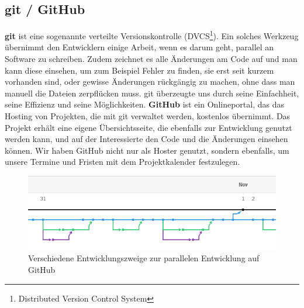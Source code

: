\documentclass[12pt,a4paper]{scrartcl}
\begin{document}
\subsection{git / GitHub}
\textbf{git} ist eine sogenannte verteilte Versionskontrolle (DVCS\footnote{Distributed Version Control System}). Ein solches Werkzeug übernimmt
den Entwicklern einige Arbeit, wenn es darum geht, parallel an Software zu schreiben. Zudem zeichnet es alle Änderungen am Code auf und man kann diese
einsehen, um zum Beispiel Fehler zu finden, sie erst seit kurzem vorhanden sind, oder gewisse Änderungen rückgängig zu machen, ohne dass man
manuell die Dateien zerpflücken muss. git überzeugte uns durch seine Einfachheit, seine Effizienz und seine Möglichkeiten. \textbf{GitHub} ist ein
Onlineportal, das das Hosting von Projekten, die mit git verwaltet werden, kostenlos übernimmt. Das Projekt erhält eine eigene Übersichtsseite,
die ebenfalls zur Entwicklung genutzt werden kann, und auf der Interessierte den Code und die Änderungen einsehen können. Wir haben GitHub nicht nur
als Hoster genutzt, sondern ebenfalls, um unsere Termine und Fristen mit dem Projektkalender festzulegen.
\begin{figure}
\centering
\includegraphics[scale=1]{img/branches.png}
\caption{Verschiedene Entwicklungszweige zur parallelen Entwicklung auf GitHub}
\label{fig:branches}
\end{figure}
\end{document}

